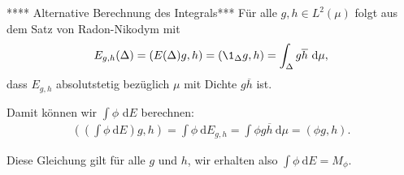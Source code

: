 \begin{solution}
**** Alternative Berechnung des Integrals***
Für alle $g, h \in L^2(\mu)$ folgt aus dem Satz von Radon-Nikodym mit
\begin{align}
    E_{g, h}(\Delta) = (E(\Delta) g, h) = (\1_\Delta g, h) = \int_{\Delta} g \overline h~\mathrm{d} \mu,
\end{align}
dass $E_{g, h}$ absolutstetig bezüglich $\mu$ mit Dichte $g\overline h$ ist.

Damit können wir $\int \phi$ d$E$ berechnen:
\begin{align}
    ((\int \phi ~\mathrm{d}E)g, h) = \int \phi ~\mathrm{d}E_{g,h} = \int \phi g \overline h~\mathrm{d} \mu = (\phi g, h).
\end{align}

Diese Gleichung gilt für alle $g$ und $h$, wir erhalten also $\int \phi ~\mathrm{d}E = M_\phi$.
\end{solution}
